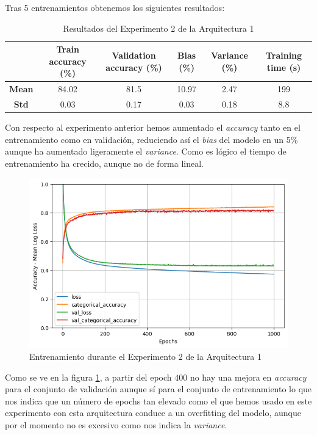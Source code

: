 \documentclass{article}
\begin{document}
			Tras 5 entrenamientos obtenemos los siguientes resultados:
			\begin{table}[!h]
			\begin{center}
				\begin{tabular}{ c | c | c | c | c | c |}
					\ & \textbf{Train accuracy (\%)} & \textbf{Validation accuracy (\%)} & \textbf{Bias (\%)} & \textbf{Variance (\%)} & \textbf{Training time (s)} \\ \hline
					\textbf{Mean} & 84.02 & 81.5 & 10.97 & 2.47 & 199\\ \hline
					\textbf{Std} & 0.03 & 0.17 & 0.03 & 0.18 & 8.8 \\ \hline
				\end{tabular}
				\caption{Resultados del Experimento 2 de la Arquitectura 1}
				\label{tab:res-a1-e2}
			\end{center}
		\end{table}
			Con respecto al experimento anterior hemos aumentado el \textit{accuracy} tanto en el entrenamiento como en validaci\'on, reduciendo as\'i el \textit{bias} del modelo en un 5\% aunque ha aumentado ligeramente el \textit{variance}. Como es l\'ogico el tiempo de entrenamiento ha crecido, aunque no de forma lineal.\\
			\begin{figure}[!h]
				\begin{center}
					\includegraphics[scale=0.5]{exp1-2.png}		
					\caption{Entrenamiento durante el Experimento 2 de la Arquitectura 1}	
					\label{tr-a1-e2}
				\end{center}
			\end{figure}
			Como se ve en la figura \ref{tr-a1-e2}, a partir del epoch 400 no hay una mejora en \textit{accuracy} para el conjunto de validaci\'on aunque s\'i para el conjunto de entrenamiento lo que nos indica que un n\'umero de epochs tan elevado como el que hemos usado en este experimento con esta arquitectura conduce a un overfitting del modelo, aunque por el momento no es excesivo como nos indica la \textit{variance}.
			
\end{document}
